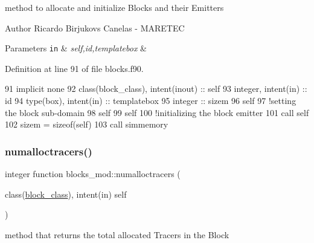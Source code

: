 method to allocate and initialize Blocks and their Emitters 

\begin{DoxyAuthor}{Author}
Ricardo Birjukovs Canelas -\/ M\+A\+R\+E\+T\+EC 
\end{DoxyAuthor}

\begin{DoxyParams}[1]{Parameters}
\mbox{\tt in}  & {\em self,id,templatebox} & \\
\hline
\end{DoxyParams}


Definition at line 91 of file blocks.\+f90.


\begin{DoxyCode}
91     \textcolor{keywordtype}{implicit none}
92     \textcolor{keywordtype}{class}(block\_class), \textcolor{keywordtype}{intent(inout)} :: self
93     \textcolor{keywordtype}{integer}, \textcolor{keywordtype}{intent(in)} :: id
94     \textcolor{keywordtype}{type}(box), \textcolor{keywordtype}{intent(in)} :: templatebox
95     \textcolor{keywordtype}{integer} :: sizem
96     self%
97     \textcolor{comment}{!setting the block sub-domain}
98     self%
99     self%
100     \textcolor{comment}{!initializing the block emitter}
101     \textcolor{keyword}{call }self%
102     sizem = sizeof(self)
103     \textcolor{keyword}{call }simmemory%
\end{DoxyCode}
\mbox{\label{namespaceblocks__mod_a7202fad0fdc07ff9111e61e3aa513af9}} 
\subsubsection{\texorpdfstring{numalloctracers()}{numalloctracers()}}
{\footnotesize\ttfamily integer function blocks\+\_\+mod\+::numalloctracers (\begin{DoxyParamCaption}\item[{class(\mbox{\hyperlink{structblocks__mod_1_1block__class}{block\+\_\+class}}), intent(in)}]{self }\end{DoxyParamCaption})\hspace{0.3cm}{\ttfamily [private]}}



method that returns the total allocated Tracers in the Block 

